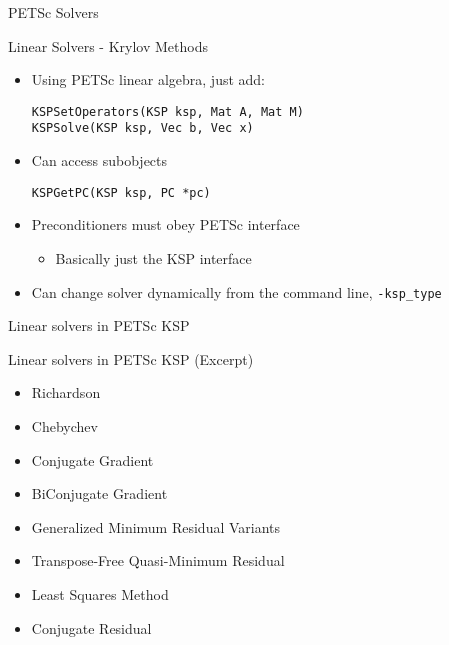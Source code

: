 \begin{frame}[fragile]{PETSc Solvers}

\begin{block}{Linear Solvers - Krylov Methods}
 \begin{itemize}
  \item Using PETSc linear algebra, just add:
  \begin{lstlisting}[basicstyle=\footnotesize\ttfamily]
KSPSetOperators(KSP ksp, Mat A, Mat M)
KSPSolve(KSP ksp, Vec b, Vec x)
  \end{lstlisting}

  \item Can access subobjects
  \begin{lstlisting}[basicstyle=\footnotesize\ttfamily]
KSPGetPC(KSP ksp, PC *pc)
  \end{lstlisting}

  \item Preconditioners must obey PETSc interface
  \begin{itemize}
    \item Basically just the KSP interface
  \end{itemize}

  \item Can change solver dynamically from the command line, \lstinline|-ksp_type|
\end{itemize}
\end{block}

\end{frame}


\begin{frame}{Linear solvers in PETSc KSP}
 \begin{block}{Linear solvers in PETSc KSP (Excerpt)}
  \begin{itemize}
  \item Richardson
  \item Chebychev
  \item Conjugate Gradient
  \item BiConjugate Gradient
  \item Generalized Minimum Residual Variants
  \item Transpose-Free Quasi-Minimum Residual
  \item Least Squares Method
  \item Conjugate Residual
  \end{itemize}
 \end{block}
\end{frame}

